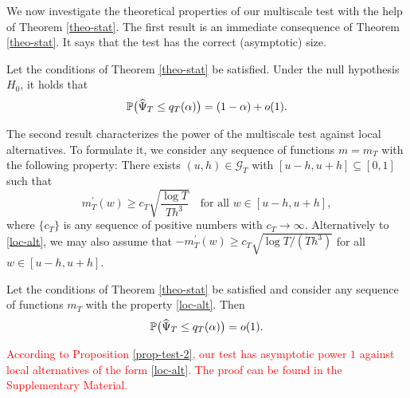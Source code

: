 We now investigate the theoretical properties of our multiscale test with the help of Theorem \ref{theo-stat}. The first result is an immediate consequence of Theorem \ref{theo-stat}. It says that the test has the correct (asymptotic) size. 
\begin{prop}\label{prop-test-1}
Let the conditions of Theorem \ref{theo-stat} be satisfied. Under the null hypothesis $H_0$, it holds that 
\[ \mathbb{P} \big( \widehat{\Psi}_T \le q_T(\alpha) \big) = (1 - \alpha) + o(1). \]
\end{prop}
The second result characterizes the power of the multiscale test against local alternatives. To formulate it, we consider any sequence of functions $m = m_T$ with the following property: There exists $(u,h) \in \mathcal{G}_T$ with $[u-h,u+h] \subseteq [0,1]$ such that 
\begin{equation}\label{loc-alt}
m_T^\prime(w) \ge c_T \sqrt{\frac{\log T}{Th^3}} \quad \text{for all } w \in [u-h,u+h], 
\end{equation}
where $\{c_T\}$ is any sequence of positive numbers with $c_T \rightarrow \infty$. Alternatively to \eqref{loc-alt}, we may also assume that $-m_T^\prime(w) \ge c_T \sqrt{\log T/(Th^3)}$ for all $w \in [u-h,u+h]$. 
\begin{prop}\label{prop-test-2}
Let the conditions of Theorem \ref{theo-stat} be satisfied and consider any sequence of functions $m_T$ with the property \eqref{loc-alt}. Then 
\[ \mathbb{P} \big( \widehat{\Psi}_T \le q_T(\alpha) \big) = o(1). \]
\end{prop}
\textcolor{red}{According to Proposition \ref{prop-test-2}, our test has asymptotic power $1$ against local alternatives of the form \eqref{loc-alt}. The proof can be found in the Supplementary Material.}


